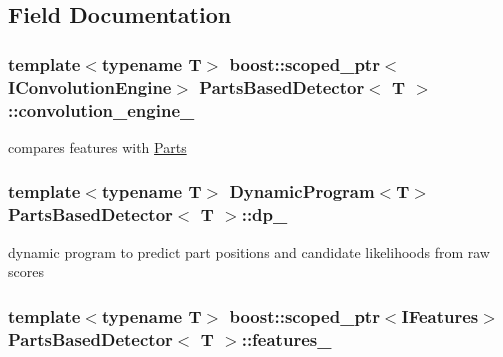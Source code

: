 \subsection{Field Documentation}
\hypertarget{classPartsBasedDetector_ad06eb05d590004fe4f6940544b90b2ba}{}
\subsubsection[{convolution\+\_\+engine\+\_\+}]{\setlength{\rightskip}{0pt plus 5cm}template$<$typename T$>$ boost\+::scoped\+\_\+ptr$<${\bf I\+Convolution\+Engine}$>$ {\bf Parts\+Based\+Detector}$<$ T $>$\+::convolution\+\_\+engine\+\_\+\hspace{0.3cm}{\ttfamily [private]}}\label{classPartsBasedDetector_ad06eb05d590004fe4f6940544b90b2ba}


compares features with \hyperlink{classParts}{Parts} 

\hypertarget{classPartsBasedDetector_af78da81781a7ad393e9e150f02ecd129}{}
\subsubsection[{dp\+\_\+}]{\setlength{\rightskip}{0pt plus 5cm}template$<$typename T$>$ {\bf Dynamic\+Program}$<$T$>$ {\bf Parts\+Based\+Detector}$<$ T $>$\+::dp\+\_\+\hspace{0.3cm}{\ttfamily [private]}}\label{classPartsBasedDetector_af78da81781a7ad393e9e150f02ecd129}


dynamic program to predict part positions and candidate likelihoods from raw scores 

\hypertarget{classPartsBasedDetector_a6242f9b02fcb1a440cc431f2fc15521f}{}
\subsubsection[{features\+\_\+}]{\setlength{\rightskip}{0pt plus 5cm}template$<$typename T$>$ boost\+::scoped\+\_\+ptr$<${\bf I\+Features}$>$ {\bf Parts\+Based\+Detector}$<$ T $>$\+::features\+\_\+\hspace{0.3cm}{\ttfamily [private]}}\label{classPartsBasedDetector_a6242f9b02fcb1a440cc431f2fc15521f}



